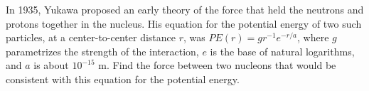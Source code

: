  In 1935, Yukawa proposed an early theory of the force
that held the neutrons and protons together in the nucleus.
His equation for the potential energy of two such particles,
at a center-to-center distance $r$, was 
$PE(r)=gr^{-1}e^{-r/a}$,
where $g$ parametrizes the strength
of the interaction, $e$ is the base of natural logarithms,
and $a$ is about $10^{-15}$ m. Find the force between two
nucleons that would be consistent with this equation for
the potential energy.
\answercheck
